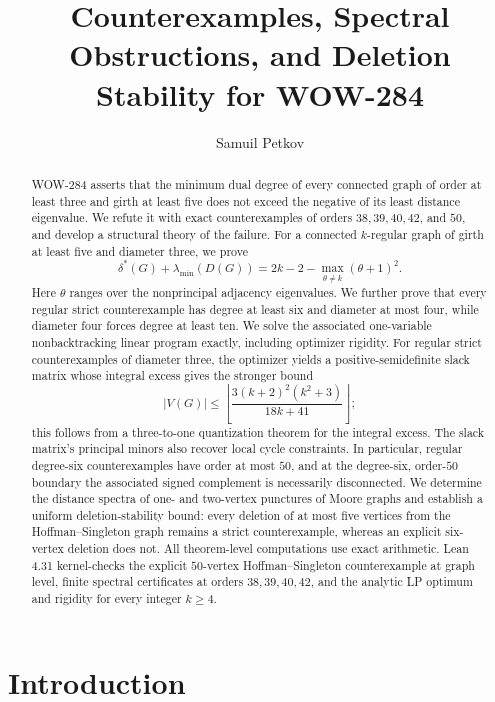 \documentclass[a4paper,10pt,reqno]{amsart}
\title[Counterexamples and obstructions for WOW-284]
{Counterexamples, Spectral Obstructions, and Deletion Stability for WOW-284}
\author{Samuil Petkov}
\date{}
\theoremstyle{plain}
\theoremstyle{definition}
\theoremstyle{remark}
\begin{document}
\begin{abstract}
WOW-284 asserts that the minimum dual degree of every connected graph of
order at least three and girth at least five does not exceed the negative of
its least distance eigenvalue.  We refute it with exact counterexamples of
orders \(38,39,40,42\), and \(50\), and develop a structural theory of the
failure.  For a connected \(k\)-regular graph of girth at least five and
diameter three, we prove
\[
 \delta^*(G)+\lambda_{\min}(D(G))
 =2k-2-\max_{\theta\ne k}(\theta+1)^2.
\]
Here \(\theta\) ranges over the nonprincipal adjacency eigenvalues.
We further prove that every regular strict counterexample has degree at least six and
diameter at most four, while diameter four forces degree at least ten.  We
solve the associated one-variable nonbacktracking linear program exactly,
including optimizer rigidity.  For regular strict counterexamples of diameter
three, the optimizer yields a positive-semidefinite slack matrix whose integral
excess gives the stronger bound
\[
 |V(G)|\le\left\lfloor
 \frac{3(k+2)^2(k^2+3)}{18k+41}
 \right\rfloor;
\]
this follows from a three-to-one quantization theorem for the integral excess.
The slack matrix's principal minors also recover local cycle constraints.  In
particular, regular degree-six counterexamples have order at most \(50\), and
at the degree-six, order-\(50\) boundary the associated signed complement is
necessarily disconnected.  We determine the distance spectra of one- and two-vertex
punctures of Moore graphs and establish a uniform deletion-stability bound:
every deletion of at most five vertices from the Hoffman--Singleton graph
remains a strict counterexample, whereas an explicit six-vertex deletion does
not.  All theorem-level computations use exact arithmetic.  Lean 4.31
kernel-checks the explicit \(50\)-vertex Hoffman--Singleton counterexample at
graph level, finite spectral certificates at orders \(38,39,40,42\), and the
analytic LP optimum and rigidity for every integer \(k\ge4\).
\end{abstract}

\maketitle

\section{Introduction}\label{sec:introduction}
\end{document}
